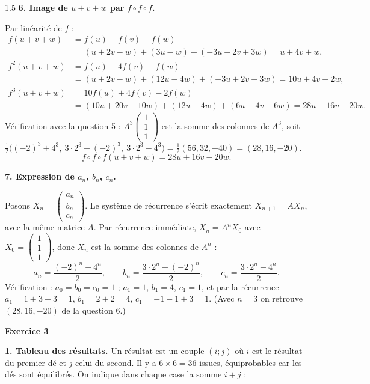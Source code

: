 \documentclass[12pt]{article}
\begin{document}
\begin{spacing}{1.5}
\textbf{6. Image de $u+v+w$ par $f\circ f\circ f$.}

Par linéarité de $f$ :
\begin{align*}
f(u+v+w)&=f(u)+f(v)+f(w)\\
&=(u+2v-w)+(3u-w)+(-3u+2v+3w)=u+4v+w,\\
f^2(u+v+w)&=f(u)+4f(v)+f(w)\\
&=(u+2v-w)+(12u-4w)+(-3u+2v+3w)=10u+4v-2w,\\
f^3(u+v+w)&=10f(u)+4f(v)-2f(w)\\
&=(10u+20v-10w)+(12u-4w)+(6u-4v-6w)=28u+16v-20w.
\end{align*}
Vérification avec la question 5 : $A^3\begin{pmatrix}1\\1\\1\end{pmatrix}$ est la somme des colonnes de $A^3$, soit $\frac12\big((-2)^3+4^3,\ 3\cdot2^3-(-2)^3,\ 3\cdot 2^3-4^3\big)=\frac12(56,32,-40)=(28,16,-20)$.
\[
\boxed{f\circ f\circ f(u+v+w)=28u+16v-20w}.
\]

\textbf{7. Expression de $a_n$, $b_n$, $c_n$.}

Posons $X_n=\begin{pmatrix}a_n\\b_n\\c_n\end{pmatrix}$. Le système de récurrence s'écrit exactement $X_{n+1}=AX_n$, avec la même matrice $A$. Par récurrence immédiate, $X_n=A^nX_0$ avec $X_0=\begin{pmatrix}1\\1\\1\end{pmatrix}$, donc $X_n$ est la somme des colonnes de $A^n$ :
\[
\boxed{a_n=\frac{(-2)^n+4^n}{2},\qquad b_n=\frac{3\cdot2^n-(-2)^n}{2},\qquad c_n=\frac{3\cdot 2^n-4^n}{2}}.
\]
Vérification : $a_0=b_0=c_0=1$ ; $a_1=1$, $b_1=4$, $c_1=1$, et par la récurrence $a_1=1+3-3=1$, $b_1=2+2=4$, $c_1=-1-1+3=1$. (Avec $n=3$ on retrouve $(28,16,-20)$ de la question 6.)

\medskip\textbf{Exercice 3}

\textbf{1. Tableau des résultats.} Un résultat est un couple $(i;j)$ où $i$ est le résultat du premier dé et $j$ celui du second. Il y a $6\times6=36$ issues, équiprobables car les dés sont équilibrés. On indique dans chaque case la somme $i+j$ :


\end{spacing}
\end{document}
